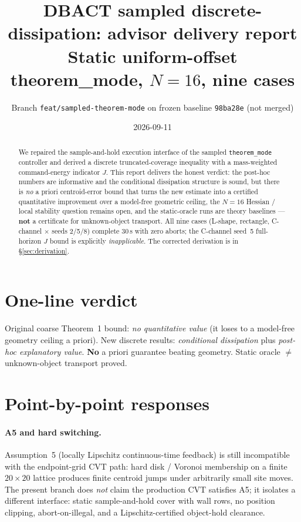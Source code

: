 \documentclass[11pt]{article}
\title{DBACT sampled discrete-dissipation: advisor delivery report\\
\large Static uniform-offset theorem\_mode, $N=16$, nine cases}
\author{Branch \texttt{feat/sampled-theorem-mode} on frozen baseline \texttt{98ba28e} (not merged)}
\date{2026-09-11}
\begin{document}
\maketitle

\begin{abstract}
We repaired the sample-and-hold execution interface of the sampled
\texttt{theorem\_mode} controller and derived a discrete truncated-coverage
inequality with a mass-weighted command-energy indicator $J$. This report
delivers the honest verdict: the post-hoc numbers are informative and the
conditional dissipation structure is sound, but there is \emph{no} a priori
centroid-error bound that turns the new estimate into a certified quantitative
improvement over a model-free geometric ceiling, the $N=16$ Hessian / local
stability question remains open, and the static-oracle runs are theory
baselines --- \textbf{not} a certificate for unknown-object transport. All nine
cases (L-shape, rectangle, C-channel $\times$ seeds 2/5/8) complete 30\,s with
zero aborts; the C-channel seed~5 full-horizon $J$ bound is explicitly
\emph{inapplicable}. The corrected derivation is in \S\ref{sec:derivation}.
\end{abstract}

\section{One-line verdict}
Original coarse Theorem~1 bound: \emph{no quantitative value} (it loses to a
model-free geometry ceiling a priori). New discrete results: \emph{conditional
dissipation} plus \emph{post-hoc explanatory value}. \textbf{No} a priori
guarantee beating geometry. Static oracle $\neq$ unknown-object transport
proved.

\section{Point-by-point responses}

\paragraph{A5 and hard switching.} Assumption~5 (locally Lipschitz
continuous-time feedback) is still incompatible with the endpoint-grid CVT path:
hard disk / Voronoi membership on a finite $20\times20$ lattice produces finite
centroid jumps under arbitrarily small site moves. The present branch does
\emph{not} claim the production CVT satisfies A5; it isolates a different
interface: static sample-and-hold cover with wall rows, no position clipping,
abort-on-illegal, and a Lipschitz-certified object-hold clearance.
\end{document}

